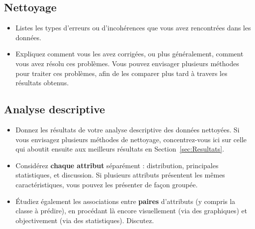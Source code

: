 \documentclass{ceri/sty/rapport}
\begin{document}
\subsection{Nettoyage}
\label{sec:Nettoyage}
\begin{itemize}
	\item Listes les types d'erreurs ou d'incohérences que vous avez rencontrées dans les données.
	\item Expliquez comment vous les avez corrigées, ou plus généralement, comment vous avez résolu ces problèmes. Vous pouvez envisager plusieurs méthodes pour traiter ces problèmes, afin de les comparer plus tard à travers les résultats obtenus.
\end{itemize}




\subsection{Analyse descriptive}
\label{sec:AnalyseDesc}
\begin{itemize}
	\item Donnez les résultats de votre analyse descriptive des données nettoyées. Si vous envisagez plusieurs méthodes de nettoyage, concentrez-vous ici sur celle qui aboutit ensuite aux meilleurs résultats en Section~\ref{sec:Resultats}.
	\item Considérez \textbf{chaque attribut} séparément : distribution, principales statistiques, et discussion. Si plusieurs attributs présentent les mêmes caractéristiques, vous pouvez les présenter de façon groupée.
	\item Étudiez également les associations entre \textbf{paires} d'attributs (y compris la classe à prédire), en procédant là encore visuellement (via des graphiques) et objectivement (via des statistiques). Discutez.
\end{itemize}
\end{document}
